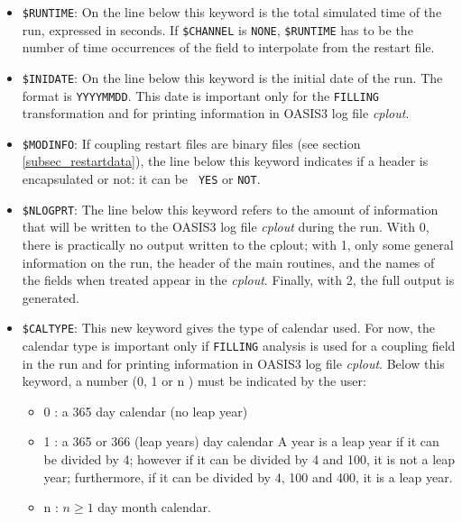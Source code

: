 \begin{itemize}
\item {\tt \$RUNTIME}: On the line below this keyword is the total
simulated time of the run, expressed in seconds. If {\tt \$CHANNEL}
is {\tt NONE}, {\tt \$RUNTIME} has to be the number of time occurrences
of the field to interpolate from the restart file. 

\item {\tt \$INIDATE}: On the line below this keyword is the initial
  date of the run. The format is {\tt YYYYMMDD}. This date is important only
  for the {\tt FILLING} transformation and for printing information in
  OASIS3 log file {\it cplout}.

\item {\tt \$MODINFO}: If coupling restart files are binary files (see
  section \ref{subsec_restartdata}), the line below this keyword
  indicates if a header is encapsulated or not: it can be {\tt
  YES} or {\tt NOT}.
 
\item {\tt \$NLOGPRT}: The line below this keyword refers to the
  amount of information that will be written to the OASIS3 log file
  {\it cplout} during the run. With 0, there is practically no output
  written to the cplout; with 1, only some general information on the
  run, the header of the main routines, and the names of the fields
  when treated appear in the {\it cplout}.  Finally, with 2, the full output
  is generated.

\item {\tt \$CALTYPE}: This new keyword gives the type of calendar
  used. For now, the calendar type is important only if {\tt FILLING}
  analysis is used for a coupling field in the run and for printing
  information in OASIS3 log file {\it cplout}. Below this keyword, a
  number (0, 1 or n ) must be indicated by the user:
  \begin{itemize}
  \item 0 : a 365 day calendar (no leap year) 
  \item 1 : a 365 or 366 (leap years) day calendar A year is a leap
  year if it can be divided by 4; however if it can be divided by 4
  and 100, it is not a leap year; furthermore, if it can be divided by
  4, 100 and 400, it is a leap year.
  \item n :  $n \ge 1$ day month calendar. 
  \end{itemize}

\end{itemize}


